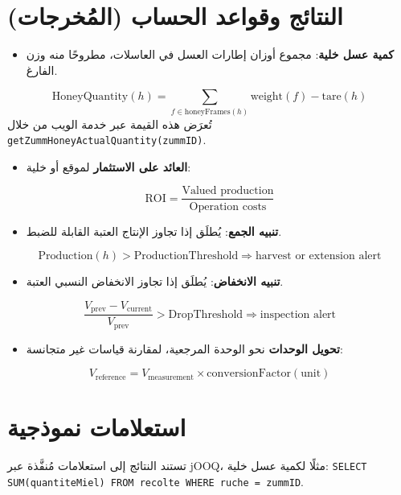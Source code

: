 \section{النتائج وقواعد الحساب (المُخرجات)}
\begin{itemize}
  \item \textbf{كمية عسل خلية}: مجموع أوزان إطارات العسل في العاسلات، مطروحًا منه وزن الفارغ.
\end{itemize}
\[ \text{HoneyQuantity}(h) = \sum_{f \in \text{honeyFrames}(h)} \text{weight}(f) - \text{tare}(h) \]
تُعرَض هذه القيمة عبر خدمة الويب من خلال \texttt{getZummHoneyActualQuantity(zummID)}.
\begin{itemize}
  \item \textbf{العائد على الاستثمار} لموقع أو خلية:
\end{itemize}
\[ \text{ROI} = \frac{\text{Valued production}}{\text{Operation costs}} \]
\begin{itemize}
  \item \textbf{تنبيه الجمع}: يُطلَق إذا تجاوز الإنتاج العتبة القابلة للضبط.
\end{itemize}
\[ \text{Production}(h) > \text{ProductionThreshold} \Rightarrow \text{harvest or extension alert} \]
\begin{itemize}
  \item \textbf{تنبيه الانخفاض}: يُطلَق إذا تجاوز الانخفاض النسبي العتبة.
\end{itemize}
\[ \frac{V_{\text{prev}} - V_{\text{current}}}{V_{\text{prev}}} > \text{DropThreshold} \Rightarrow \text{inspection alert} \]
\begin{itemize}
  \item \textbf{تحويل الوحدات} نحو الوحدة المرجعية، لمقارنة قياسات غير متجانسة:
\end{itemize}
\[ V_{\text{reference}} = V_{\text{measurement}} \times \text{conversionFactor}(\text{unit}) \]

\section{استعلامات نموذجية}
تستند النتائج إلى استعلامات مُنفَّذة عبر \textenglish{jOOQ}، مثلًا لكمية عسل
خلية: \texttt{SELECT SUM(quantiteMiel) FROM recolte WHERE ruche = zummID}.
